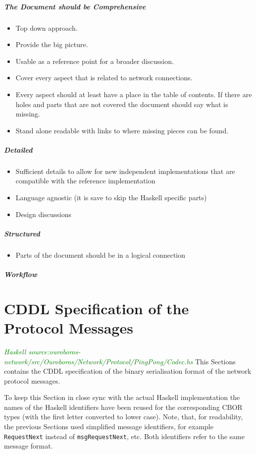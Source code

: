 \documentclass{report}
\newcommand{\hsref}[1]{{\textcolor{green}{\emph{Haskell source:#1}}}}
\theoremstyle{definition}{
  \newtheorem{lemma}{Lemma}[section] %
  \newtheorem{definition}[lemma]{Definition}
}
\theoremstyle{theorem}{
  \newtheorem{invariant}[lemma]{Invariant}
  \newtheorem{proofobligation}[lemma]{Proof Obligation}
}
\numberwithin{equation}{lemma}
\begin{document}
\subparagraph{The Document should be Comprehensive}
\begin{itemize}
\item Top down approach.
\item Provide the big picture.
\item Usable as a reference point for a broader discussion.
\item Cover every aspect that is related to network connections.
\item Every aspect should at least have a place in the table of contents.
  If there are holes and parts that are not covered the document should say what is missing.
\item Stand alone readable with links to where missing pieces can be found.
\end{itemize}

\subparagraph{Detailed}
\begin{itemize}
\item Sufficient details to allow for new independent implementations that are compatible with
the reference implementation
\item Language agnostic (it is save to skip the Haskell specific parts)
\item Design discussions
\end{itemize}
\subparagraph{Structured}
\begin{itemize}
\item Parts of the document should be in a logical connection
\end{itemize}
\subparagraph{Workflow}

\appendix
\section{CDDL Specification of the Protocol Messages}
\hsref{ouroboros-network/src/Ouroboros/Network/Protocol/PingPong/Codec.hs}
\label{included-cddl}
\label{CBOR-section}
This Sections contains the CDDL\cite{cddl} specification
of the binary serialisation format of the network protocol messages.

To keep this Section in close sync with the actual Haskell implementation
the names of the Haskell identifiers have been reused for the corresponding
CBOR types (with the first letter converted to lower case).
Note, that, for readability, the previous Sections used simplified message identifiers,
for example {\tt RequestNext} instead of {\tt msgRequestNext}, etc.
Both identifiers refer to the same message format.
\end{document}
